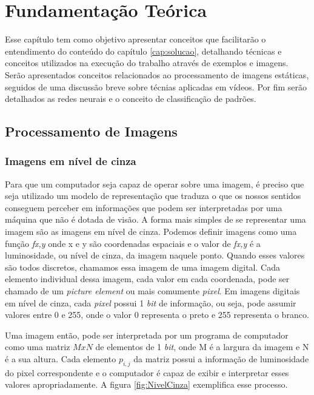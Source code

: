 \chapter{Fundamentação Teórica}\label{cap:fundament}



Esse capítulo tem como objetivo apresentar conceitos que facilitarão o entendimento do conteúdo do capítulo \ref{cap:solucao}, detalhando técnicas e conceitos utilizados na execução do trabalho através de exemplos e imagens. Serão apresentados conceitos relacionados ao processamento de imagens estáticas, seguidos de uma discussão breve sobre técnias aplicadas em vídeos. Por fim serão detalhados as redes neurais e o conceito de classificação de padrões.

\section{Processamento de Imagens}\label{sec:processamento}

\subsection{Imagens em nível de cinza}

Para que um computador seja capaz de operar sobre uma imagem, é preciso que seja utilizado um modelo de representação que traduza o que os nossos sentidos conseguem perceber em informações que podem ser interpretadas por uma máquina que não é dotada de visão. A forma mais simples de se representar uma imagem são as imagens em nível de cinza. Podemos definir imagens como uma função \textit{f{x,y}} onde x e y são coordenadas espaciais e o valor de  \textit{f{x,y}} é a luminosidade, ou nível de cinza, da imagem naquele ponto. Quando esses valores são todos discretos, chamamos essa imagem de uma imagem digital.\cite{gonzalez2009digital} Cada elemento individual dessa imagem, cada valor em cada coordenada, pode ser chamado de um \textit{picture element} ou mais comumente \textit{pixel}. Em imagens digitais em nível de cinza, cada \textit{pixel} possui 1 \textit{bit} de informação, ou seja, pode assumir valores entre 0 e 255, onde o valor 0 representa o preto e 255 representa o branco. 

Uma imagem então, pode ser interpretada por um programa de computador como uma matriz $MxN$ de elementos de 1 \textit{bit}, onde M é a largura da imagem e N é a sua altura. Cada elemento $p_{i,j}$ da matriz possui a informação de luminosidade do pixel correspondente e o computador é capaz de exibir e interpretar esses valores apropriadamente. A figura \ref{fig:NivelCinza} exemplifica esse processo.

